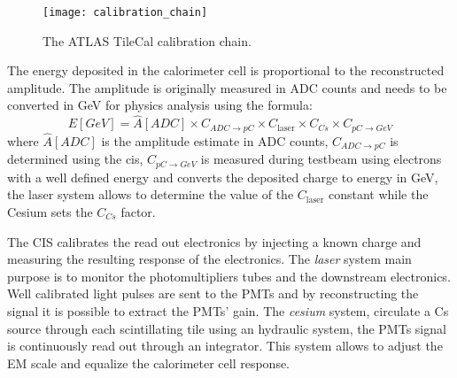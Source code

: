 \begin{figure}[!h]
  \centering
    \texttt{[image: calibration\_chain]}
    \caption{The ATLAS TileCal calibration chain.}
    \label{fig:cali_chain}
\end{figure}

The energy deposited in the calorimeter cell is proportional to the
reconstructed amplitude. The amplitude is originally measured in ADC counts and
needs to be converted in GeV for physics analysis using the formula:
\begin{equation}
  \label{eq:70}
  E[GeV] = \hat{A}[ADC] \times C_{ADC \rightarrow pC} \times C_{\text{laser}}
  \times C_{Cs} \times C_{pC \rightarrow GeV}
\end{equation}
where $\hat{A}[ADC]$ is the amplitude estimate in ADC counts, $C_{ADC \rightarrow
pC}$ is determined using the \gls{cis}, $C_{pC \rightarrow
  GeV}$ is measured during testbeam using electrons with a well defined energy
and converts the deposited charge to energy in GeV, the laser system allows to
determine the value of the $C_{\text{laser}}$ constant while the Cesium sets the
$C_{Cs}$ factor.

The CIS calibrates the read out electronics by injecting a known charge and
measuring the resulting response of the electronics. The \emph{laser} system
main purpose is to monitor the photomultipliers tubes and the downstream
electronics. Well calibrated light pulses are sent to the PMTs and by
reconstructing the signal it is possible to extract the PMTs' gain. The
\emph{cesium} system, circulate a Cs source through each scintillating tile
using an hydraulic system, the PMTs signal is continuously read out through an
integrator. This system allows to adjust the EM scale and equalize the
calorimeter cell response.
